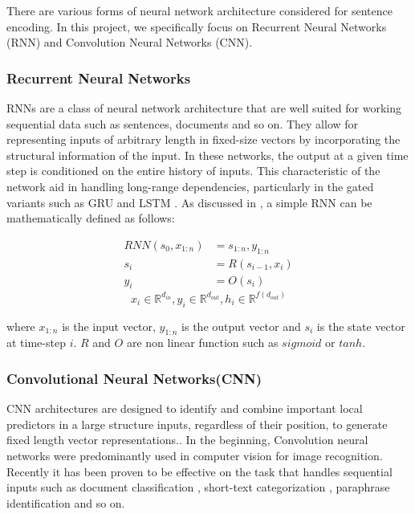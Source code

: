\documentclass[12pt]{report} %
\begin{document}
There are various forms of neural network architecture considered for sentence encoding. In this project, we specifically focus on Recurrent Neural Networks (RNN) and Convolution Neural Networks (CNN).

\subsubsection*{Recurrent Neural Networks}
RNNs are a class of neural network architecture that are well suited for working sequential data such as sentences, documents and so on. They allow for representing inputs of arbitrary length in fixed-size vectors by incorporating the structural information of the input. In these networks, the output at a given time step is conditioned on the entire history of inputs. This characteristic of the network aid in handling long-range dependencies, particularly in the gated variants such as GRU \citep{cho2014learning} and LSTM \citep{hochreiter1997long}.  As discussed in \cite{goldberg2016primer}, a simple RNN can be mathematically defined as follows:

\begin{align}
RNN(s_0,x_{1:n}) &= s_{1:n},  y_{1:n} \\
s_i &= R(s_{i-1},x_i) \\
y_i &= O(s_i)
\end{align}
\[ 
x_i \in \mathbb{R}^{d_{in}}, y_i \in \mathbb{R}^{d_{out}}, h_i \in \mathbb{R}^{f({d_{out}})} \]

where $x_{1:n}$ is the input vector, $y_{1:n}$ is the output vector and $s_{i}$ is the state vector at time-step $i$. $R$ and $O$ are non linear function such as $sigmoid$ or $tanh$.




\subsubsection*{Convolutional Neural Networks(CNN)}
CNN architectures are designed to identify and combine important local predictors in a large structure inputs, regardless of their position, to generate fixed length vector representations.\citep{goldberg2016primer}. In the beginning, Convolution neural networks were predominantly used in computer vision for image recognition. Recently it has been proven to be effective on the task that handles sequential inputs such as document classification \citep{johnson2015effective}, short-text categorization \citep{wang2015semantic}, paraphrase identification \citep{yin2015convolutional} and so on. 
\end{document}

